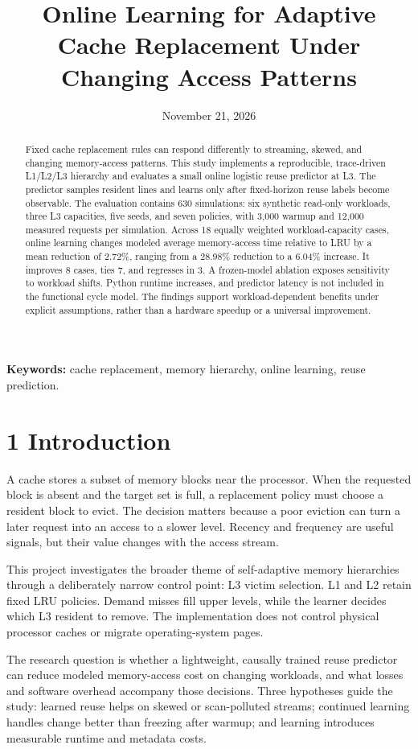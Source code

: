 \documentclass[10pt,a4paper]{article}
\title{Online Learning for Adaptive Cache Replacement Under Changing Access Patterns}
\author{}
\date{November 21, 2026}
\begin{document}
\maketitle
\begin{abstract}
Fixed cache replacement rules can respond differently to streaming, skewed, and changing memory-access patterns. This study implements a reproducible, trace-driven L1/L2/L3 hierarchy and evaluates a small online logistic reuse predictor at L3. The predictor samples resident lines and learns only after fixed-horizon reuse labels become observable. The evaluation contains 630 simulations: six synthetic read-only workloads, three L3 capacities, five seeds, and seven policies, with 3,000 warmup and 12,000 measured requests per simulation. Across 18 equally weighted workload-capacity cases, online learning changes modeled average memory-access time relative to LRU by a mean reduction of 2.72\%, ranging from a 28.98\% reduction to a 6.04\% increase. It improves 8 cases, ties 7, and regresses in 3. A frozen-model ablation exposes sensitivity to workload shifts. Python runtime increases, and predictor latency is not included in the functional cycle model. The findings support workload-dependent benefits under explicit assumptions, rather than a hardware speedup or a universal improvement.
\end{abstract}
\noindent\textbf{Keywords:} cache replacement, memory hierarchy, online learning, reuse prediction.
\section*{1 Introduction}
A cache stores a subset of memory blocks near the processor. When the requested block is absent and the target set is full, a replacement policy must choose a resident block to evict. The decision matters because a poor eviction can turn a later request into an access to a slower level. Recency and frequency are useful signals, but their value changes with the access stream.

This project investigates the broader theme of self-adaptive memory hierarchies through a deliberately narrow control point: L3 victim selection. L1 and L2 retain fixed LRU policies. Demand misses fill upper levels, while the learner decides which L3 resident to remove. The implementation does not control physical processor caches or migrate operating-system pages.

The research question is whether a lightweight, causally trained reuse predictor can reduce modeled memory-access cost on changing workloads, and what losses and software overhead accompany those decisions. Three hypotheses guide the study: learned reuse helps on skewed or scan-polluted streams; continued learning handles change better than freezing after warmup; and learning introduces measurable runtime and metadata costs.
\end{document}
